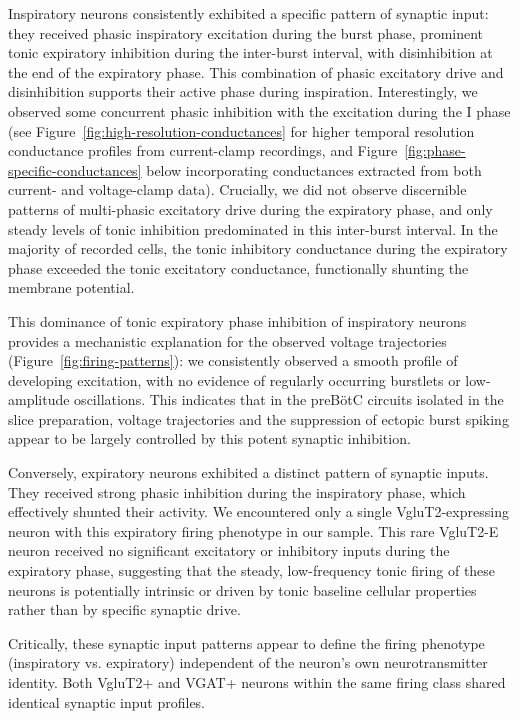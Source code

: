\documentclass[
]{article}
\newcommand{\figref}[1]{Figure~\ref{#1}}
\begin{document}
Inspiratory neurons consistently exhibited a specific pattern of synaptic input: they received phasic inspiratory excitation during the burst phase, prominent tonic expiratory inhibition during the inter-burst interval, with disinhibition at the end of the expiratory phase. This combination of phasic excitatory drive and disinhibition supports their active phase during inspiration. Interestingly, we observed some concurrent phasic inhibition with the excitation during the I phase (see \figref{fig:high-resolution-conductances} for higher temporal resolution conductance profiles from current-clamp recordings, and \figref{fig:phase-specific-conductances} below incorporating conductances extracted from both current- and voltage-clamp data). Crucially, we did not observe discernible patterns of multi-phasic excitatory drive during the expiratory phase, and only steady levels of tonic inhibition predominated in this inter-burst interval. In the majority of recorded cells, the tonic inhibitory conductance during the expiratory phase exceeded the tonic excitatory conductance, functionally shunting the membrane potential.

This dominance of tonic expiratory phase inhibition of inspiratory neurons provides a mechanistic explanation for the observed voltage trajectories (\figref{fig:firing-patterns}): we consistently observed a smooth profile of developing excitation, with no evidence of regularly occurring burstlets or low-amplitude oscillations. This indicates that in the preBötC circuits isolated in the slice preparation, voltage trajectories and the suppression of ectopic burst spiking appear to be largely controlled by this potent synaptic inhibition.

Conversely, expiratory neurons exhibited a distinct pattern of synaptic inputs. They received strong phasic inhibition during the inspiratory phase, which effectively shunted their activity. We encountered only a single VgluT2-expressing neuron with this expiratory firing phenotype in our sample. This rare VgluT2-E neuron received no significant excitatory or inhibitory inputs during the expiratory phase, suggesting that the steady, low-frequency tonic firing of these neurons is potentially intrinsic or driven by tonic baseline cellular properties rather than by specific synaptic drive.

Critically, these synaptic input patterns appear to define the firing phenotype (inspiratory vs. expiratory) independent of the neuron's own neurotransmitter identity. Both VgluT2+ and VGAT+ neurons within the same firing class shared identical synaptic input profiles.
\end{document}
